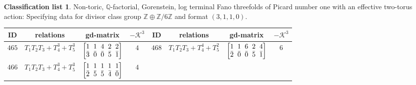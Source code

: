 \documentclass[pdftex]{sigma}%
\theoremstyle{definition}
\newtheorem{class-list}[thm]{Classification list}
\def\ZZ{{\mathbb Z}}
\def\QQ{{\mathbb Q}}
\numberwithin{equation}{section}
\begin{document}
\begin{class-list}
Non-toric, $\QQ$-factorial, Gorenstein, log terminal Fano
threefolds of Picard number one with an effective two-torus action:
Specifying data for divisor class group $\ZZ\oplus \ZZ/6\ZZ$ and
format $(3,1,1,0)$.
\begin{table}[h!]\centering\setlength{\tabcolsep}{3.5pt}
\renewcommand{\arraystretch}{1.1}\small\tabulinesep=1mm
\begin{tabu}{c|c|c|c||c|c|c|c}
\hline
ID&relations&gd-matrix&$-\mathcal{K}^3$&ID&relations&gd-matrix&$-\mathcal{K}^3$
\\
\hline
${465}$&${T_{1}T_{2}T_{3}+T_{4}^{3}+T_{5}^{3}}$
&$\arraycolsep=1mm\begin{bmatrix}{1} & {1} & {4} & {2} & {2} \\ {\bar{3}} & {\bar{0}} & {\bar{0}} & {\bar{5}} & {\bar{1}}\end{bmatrix}$&${4}$
&${468}$&${T_{1}T_{2}T_{3}+T_{4}^{4}+T_{5}^{2}}$
&$\arraycolsep=1mm\begin{bmatrix}{1} & {1} & {6} & {2} & {4} \\ {\bar{2}} & {\bar{0}} & {\bar{0}} & {\bar{5}} & {\bar{1}}\end{bmatrix}$&${6}$
\\
\hline
${466}$&${T_{1}T_{2}T_{3}+T_{4}^{3}+T_{5}^{3}}$
&$\arraycolsep=1mm\begin{bmatrix}{1} & {1} & {1} & {1} & {1} \\ {\bar{2}} & {\bar{5}} & {\bar{5}} & {\bar{4}} & {\bar{0}}\end{bmatrix}$&${4}$
\\
\end{tabu}\vspace{-2mm}
\end{table}
\end{class-list}
\end{document}

